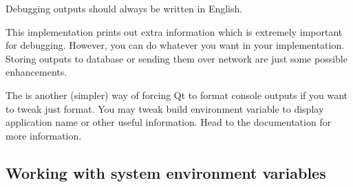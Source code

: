 \begin{fdocextra}
Debugging outputs should always be written in English.
\end{fdocextra}

This implementation prints out extra information which is extremely important for debugging. However, you can do whatever you want in your implementation. Storing outputs to database or sending them over network are just some possible enhancements.

The is another (simpler) way of forcing Qt to format console outputs if you want to tweak just format. You may tweak build environment variable to display application name or other useful information. Head to the documentation \citep{various:qtdoc} for more information.

\subsection{Working with system environment variables}